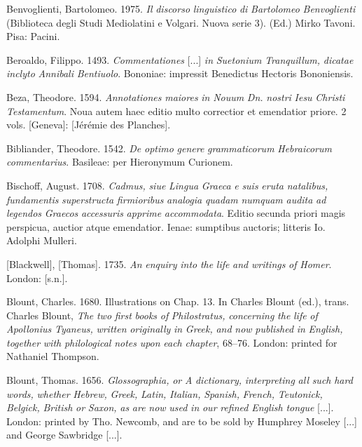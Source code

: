Benvoglienti, Bartolomeo. 1975. \textit{Il} \textit{discorso} \textit{linguistico} \textit{di} \textit{Bartolomeo} \textit{Benvoglienti} (Biblioteca degli Studi Mediolatini e Volgari. Nuova serie 3). (Ed.) Mirko Tavoni. Pisa: Pacini.

Beroaldo, Filippo. 1493. \textit{Commentationes} [...] \textit{in} \textit{Suetonium} \textit{Tranquillum,} \textit{dicatae} \textit{inclyto} \textit{Annibali} \textit{Bentiuolo}. Bononiae: impressit Benedictus Hectoris Bononiensis.

Beza, Theodore. 1594. \textit{Annotationes} \textit{maiores} \textit{in} \textit{Nouum} \textit{Dn.} \textit{nostri} \textit{Iesu} \textit{Christi} \textit{Testamentum}. Noua autem haec editio multo correctior et emendatior priore. 2 vols. [Geneva]: [Jérémie des Planches].

Bibliander, Theodore. 1542. \textit{De} \textit{optimo} \textit{genere} \textit{grammaticorum} \textit{Hebraicorum} \textit{commentarius}. Basileae: per Hieronymum Curionem.

Bischoff, August. 1708. \textit{Cadmus,} \textit{siue} \textit{Lingua} \textit{Graeca} \textit{e} \textit{suis} \textit{eruta} \textit{natalibus,} \textit{fundamentis} \textit{superstructa} \textit{firmioribus} \textit{analogia} \textit{quadam} \textit{numquam} \textit{audita} \textit{ad} \textit{legendos} \textit{Graecos} \textit{accessuris} \textit{apprime} \textit{accommodata}. Editio secunda priori magis perspicua, auctior atque emendatior. Ienae: sumptibus auctoris; litteris Io. Adolphi Mulleri.

[Blackwell], [Thomas]. 1735. \textit{An} \textit{enquiry} \textit{into} \textit{the} \textit{life} \textit{and} \textit{writings} \textit{of} \textit{Homer}. London: [s.n.].

Blount, Charles. 1680. Illustrations on Chap. 13. In Charles Blount (ed.), trans. Charles Blount, \textit{The} \textit{two} \textit{first} \textit{books} \textit{of} \textit{Philostratus,} \textit{concerning} \textit{the} \textit{life} \textit{of} \textit{Apollonius} \textit{Tyaneus,} \textit{written} \textit{originally} \textit{in} \textit{Greek,} \textit{and} \textit{now} \textit{published} \textit{in} \textit{English,} \textit{together} \textit{with} \textit{philological} \textit{notes} \textit{upon} \textit{each} \textit{chapter}, 68–76. London: printed for Nathaniel Thompson.

Blount, Thomas. 1656. \textit{Glossographia,} \textit{or} \textit{A} \textit{dictionary,} \textit{interpreting} \textit{all} \textit{such} \textit{hard} \textit{words,} \textit{whether} \textit{Hebrew,} \textit{Greek,} \textit{Latin,} \textit{Italian,} \textit{Spanish,} \textit{French,} \textit{Teutonick,} \textit{Belgick,} \textit{British} \textit{or} \textit{Saxon,} \textit{as} \textit{are} \textit{now} \textit{used} \textit{in} \textit{our} \textit{refined} \textit{English} \textit{tongue} [...]. London: printed by Tho. Newcomb, and are to be sold by Humphrey Moseley [...] and George Sawbridge [...].

